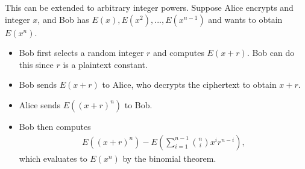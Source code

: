 This can be extended to arbitrary integer powers.
Suppose Alice encrypts and integer $x$, and Bob has $E(x), E(x^2), ..., E(x^{n-1})$ and wants to obtain $E(x^n)$.
\begin{itemize}
	\item Bob first selects a random integer $r$ and computes $E(x+r)$. Bob can do this since $r$ is a plaintext constant.
	\item Bob sends $E(x+r)$ to Alice, who decrypts the ciphertext to obtain $x+r$.
	\item Alice sends $E((x+r)^n)$ to Bob.
	\item Bob then computes
	\begin{align*}
		E((x+r)^n) - E\left(\sum_{i=1}^{n-1}{\binom{n}{i}x^ir^{n-i}}\right),
	\end{align*}
	which evaluates to $E(x^n)$ by the binomial theorem.
\end{itemize}
